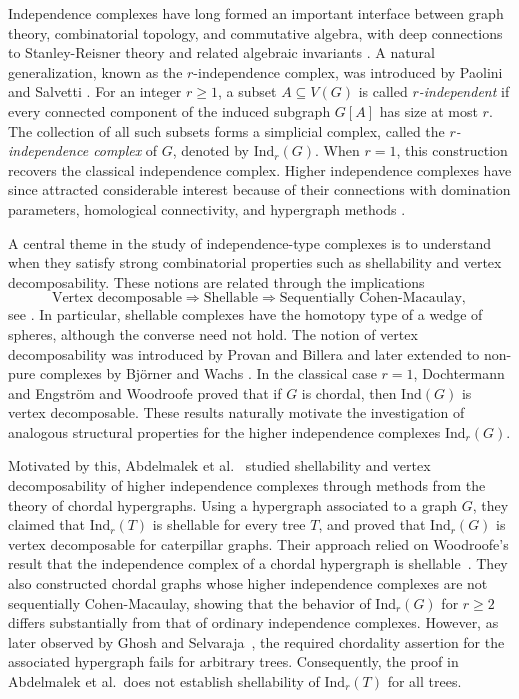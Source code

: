 \documentclass[12pt,reqno]{amsart}
\theoremstyle{definition}
\def\Ind{\mathrm{Ind}}
\begin{document}
Independence complexes have long formed an important interface between graph theory, combinatorial topology, and commutative algebra, with deep connections to Stanley-Reisner theory and related algebraic invariants \cite{EB07,AD09,AE11,FC05,HH04,SM16,RV90,MW97,RW09}. A natural generalization, known as the $r$-independence complex, was introduced by Paolini and Salvetti \cite{PG17}. For an integer $r\ge1$, a subset $A\subseteq V(G)$ is called \emph{$r$-independent} if every connected component of the induced subgraph $G[A]$ has size at most $r$. The collection of all such subsets forms a simplicial complex, called the \emph{$r$-independence complex} of $G$, denoted by $\Ind_r(G)$. When $r=1$, this construction recovers the classical independence complex. Higher independence complexes have since attracted considerable interest because of their connections with domination parameters, homological connectivity, and hypergraph methods \cite{PD22,PD21,AG25}.

A central theme in the study of independence-type complexes is to understand when they satisfy strong combinatorial properties such as shellability and vertex decomposability. These notions are related through the implications
\[
\text{Vertex decomposable}
\Rightarrow
\text{Shellable}
\Rightarrow
\text{Sequentially Cohen-Macaulay},
\]
see \cite{JJonsson08}. In particular, shellable complexes have the homotopy type of a wedge of spheres, although the converse need not hold. The notion of vertex decomposability was introduced by Provan and Billera \cite{PB80} and later extended to non-pure complexes by Bj\"orner and Wachs \cite{BW96,BW97}. In the classical case $r=1$, Dochtermann and Engstr\"om \cite{AD09} and Woodroofe \cite{RW09} proved that if $G$ is chordal, then $\Ind(G)$ is vertex decomposable. These results naturally motivate the investigation of analogous structural properties for the higher independence complexes $\Ind_r(G)$.

Motivated by this, Abdelmalek et al.~\cite{PD23chordal} studied shellability and vertex decomposability of higher independence complexes through methods from the theory of chordal hypergraphs. Using a hypergraph associated to a graph $G$, they claimed that $\Ind_r(T)$ is shellable for every tree $T$, and proved that $\Ind_r(G)$ is vertex decomposable for caterpillar graphs. Their approach relied on Woodroofe's result that the independence complex of a chordal hypergraph is shellable~\cite{RW09clutters}. They also constructed chordal graphs whose higher independence complexes are not sequentially Cohen-Macaulay, showing that the behavior of $\Ind_r(G)$ for $r \ge 2$ differs substantially from that of ordinary independence complexes. However, as later observed by Ghosh and Selvaraja~\cite[Remark 4.2]{AG25}, the required chordality assertion for the associated hypergraph fails for arbitrary trees. Consequently, the proof in Abdelmalek et al.~does not establish shellability of $\Ind_r(T)$ for all trees.
\end{document}
